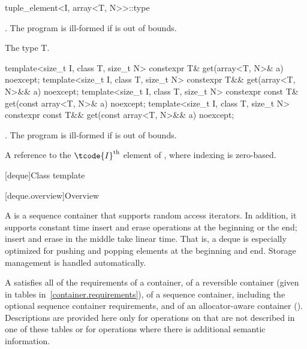 %
\begin{itemdecl}
tuple_element<I, array<T, N>>::type
\end{itemdecl}

\begin{itemdescr}
\pnum
\requires {}. The program is ill-formed if  is out of bounds.

\pnum
\cvalue  The type T.
\end{itemdescr}

%
\begin{itemdecl}
template<size_t I, class T, size_t N>
  constexpr T& get(array<T, N>& a) noexcept;
template<size_t I, class T, size_t N>
  constexpr T&& get(array<T, N>&& a) noexcept;
template<size_t I, class T, size_t N>
  constexpr const T& get(const array<T, N>& a) noexcept;
template<size_t I, class T, size_t N>
  constexpr const T&& get(const array<T, N>&& a) noexcept;
\end{itemdecl}

\begin{itemdescr}
\pnum
\requires {}. The program is ill-formed if  is out of bounds.

\pnum
\returns A reference to the $\tcode{I}^\text{th}$ element of ,
where indexing is zero-based.
\end{itemdescr}

[deque]{Class template }

[deque.overview]{Overview}

\pnum
A
%
is a sequence container that supports random access iterators.
In addition, it supports constant time insert and erase operations at the beginning or the end;
insert and erase in the middle take linear time.
That is, a deque is especially optimized for pushing and popping elements at the beginning and end.
Storage management is handled automatically.

\pnum
A
satisfies all of the requirements of a container, of a reversible container
(given in tables in~\ref{container.requirements}), of a sequence container,
including the optional sequence container requirements, and of an allocator-aware container ().
Descriptions are provided here only for operations on
that are not described in one of these tables
or for operations where there is additional semantic information.

